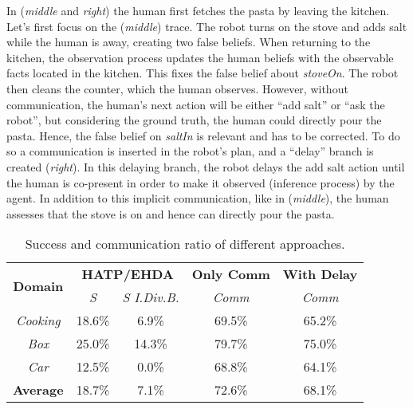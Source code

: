 {In (\textit{middle} and \textit{right}) the human first fetches the pasta by leaving the kitchen. Let's first focus on the (\textit{middle}) trace. The robot turns on the stove and adds salt while the human is away, creating two false beliefs. When returning to the kitchen, the observation process updates the human beliefs with the observable facts located in the kitchen. This fixes the false belief about \textit{stoveOn}. The robot then cleans the counter, which the human observes. 
However, without communication, the human's next action will be either ``add salt'' or ``ask the robot'', but considering the ground truth, the human could directly pour the pasta. Hence, the false belief on \textit{saltIn} is relevant and has to be corrected. To do so a communication is inserted in the robot's plan, and a ``delay'' branch is created (\textit{right}). 
In this delaying branch, the robot delays the add salt action until the human is co-present in order to make it observed (inference process) by the agent. 
In addition to this implicit communication, like in (\textit{middle}), the human assesses that the stove is on and hence can directly pour the pasta. 
\begin{table}[t]
    \centering
    \vspace{0.1cm}
    \caption
    {
    Success and communication ratio of different approaches. 
    }
    \label{tab:q_results}
    \begin{tabular}{@{}c|c c|| c| c@{}}
        \multirow{2}{*}{\textbf{Domain}} & \multicolumn{2}{c||}{\textbf{HATP/EHDA}} & \multicolumn{1}{c|}{\textbf{Only Comm}} & \multicolumn{1}{c}{\textbf{With Delay}}
        \\
        & \multicolumn{1}{c}{\textit{S}} & \multicolumn{1}{c||}{\textit{S I.Div.B.}} & \multicolumn{1}{c|}{\textit{Comm}} & \multicolumn{1}{c}{\textit{Comm}} 
        \\ \cline{1-5}
        \textit{Cooking}    &   18.6\%  &  6.9\%    & 69.5\% & 65.2\%\\
        \textit{Box}        &   25.0\%  & 14.3\%    & 79.7\% & 75.0\%\\
        \textit{Car}        &   12.5\%  & 0.0\%     & 68.8\% & 64.1\%\\
        \hline
        \textbf{Average}    &   18.7\%  & 7.1\%     & 72.6\% & 68.1\%\\
    \end{tabular}
\end{table}

}
